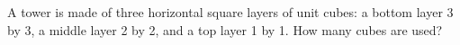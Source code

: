 A tower is made of three horizontal square layers of unit cubes: a bottom layer 3 by 3, a middle layer 2 by 2, and a top layer 1 by 1. How many cubes are used?
